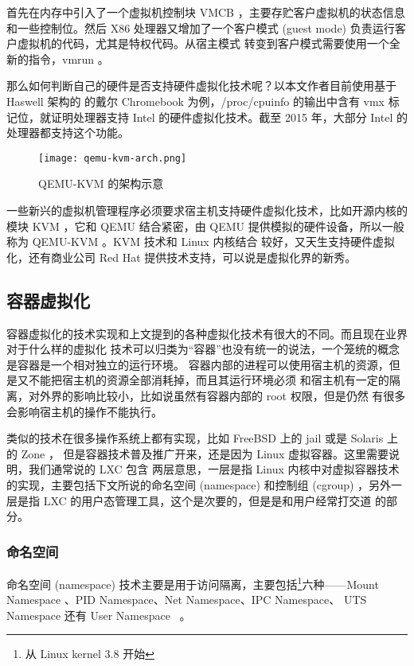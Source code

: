 首先在内存中引入了一个虚拟机控制块 VMCB ，主要存贮客户虚拟机的状态信息和一些控制位。然后 X86
处理器又增加了一个客户模式 (guest mode) 负责运行客户虚拟机的代码，尤其是特权代码。从宿主模式
转变到客户模式需要使用一个全新的指令，vmrun 。

那么如何判断自己的硬件是否支持硬件虚拟化技术呢？以本文作者目前使用基于 Haswell 架构的
的戴尔 Chromebook 为例，/proc/cpuinfo 的输出中含有 vmx 标记位，就证明处理器支持
 Intel 的硬件虚拟化技术。截至 2015 年，大部分 Intel 的处理器都支持这个功能。

 \begin{figure}[h]
     \centering
     \texttt{[image: qemu-kvm-arch.png]}
     \caption{QEMU-KVM 的架构示意}
 \end{figure}

一些新兴的虚拟机管理程序必须要求宿主机支持硬件虚拟化技术，比如开源内核的模块 KVM ，它和 QEMU
结合紧密，由 QEMU 提供模拟的硬件设备，所以一般称为 QEMU-KVM 。KVM 技术和 Linux 内核结合
较好，又天生支持硬件虚拟化，还有商业公司 Red Hat 提供技术支持，可以说是虚拟化界的新秀。

\subsection{容器虚拟化}

容器虚拟化的技术实现和上文提到的各种虚拟化技术有很大的不同。而且现在业界对于什么样的虚拟化
技术可以归类为“容器”也没有统一的说法，一个笼统的概念是容器是一个相对独立的运行环境。
容器内部的进程可以使用宿主机的资源，但是又不能把宿主机的资源全部消耗掉，而且其运行环境必须
和宿主机有一定的隔离，对外界的影响比较小，比如说虽然有容器内部的 root 权限，但是仍然
有很多会影响宿主机的操作不能执行。

类似的技术在很多操作系统上都有实现，比如 FreeBSD 上的 jail 或是 Solaris 上的 Zone ，
但是容器技术普及推广开来，还是因为 Linux 虚拟容器。这里需要说明，我们通常说的 LXC 包含
两层意思，一层是指 Linux 内核中对虚拟容器技术的实现，主要包括下文所说的命名空间 (namespace)
和控制组 (cgroup) ，另外一层是指 LXC 的用户态管理工具，这个是次要的，但是是和用户经常打交道
的部分。

\subsubsection{命名空间}
\label{subsubsec:namespace}

命名空间 (namespace) 技术主要是用于访问隔离，主要包括\footnote{从 Linux kernel
 3.8 开始}六种——Mount Namespace 、PID Namespace、Net Namespace、IPC Namespace、
UTS Namespace 还有 User Namespace ~\cite{docker-in-practice}。

